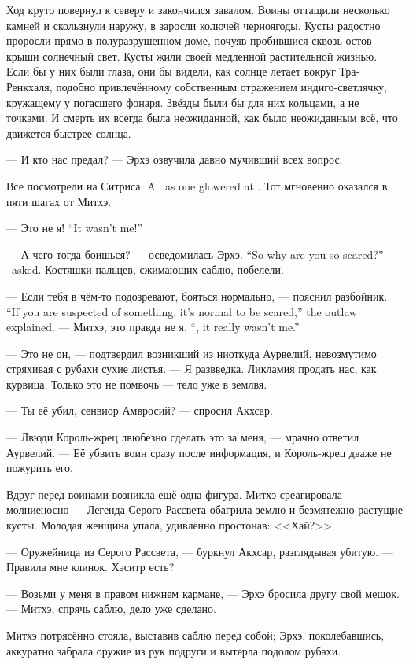 Ход круто повернул к северу и закончился завалом.
Воины оттащили несколько камней и скользнули наружу, в заросли колючей черноягоды.
Кусты радостно проросли прямо в полуразрушенном доме, почуяв пробившися сквозь остов крыши солнечный свет.
Кусты жили своей медленной растительной жизнью.
Если бы у них были глаза, они бы видели, как солнце летает вокруг Тра-Ренкхаля, подобно привлечённому собственным отражением индиго-светлячку, кружащему у погасшего фонаря.
Звёзды были бы для них кольцами, а не точками.
И смерть их всегда была неожиданной, как было неожиданным всё, что движется быстрее солнца.

--- И кто нас предал? --- Эрхэ озвучила давно мучивший всех вопрос.

{Все посмотрели на Ситриса.}
{All as one glowered at \Sitris.}
Тот мгновенно оказался в пяти шагах от Митхэ.

{--- Это не я!}
{``It wasn't me!''}

{--- А чего тогда боишься? --- осведомилась Эрхэ.}
{``So why are you so scared?'' \Oerchoe\ asked.}
Костяшки пальцев, сжимающих саблю, побелели.

{--- Если тебя в чём-то подозревают, бояться нормально, --- пояснил разбойник.}
{``If you are suspected of something, it's normal to be scared,'' the outlaw explained.}
{--- Митхэ, это правда не я.}
{``\Mitchoe, it really wasn't me.''}

--- Это не он, --- подтвердил возникший из ниоткуда Аурвелий, невозмутимо стряхивая с рубахи сухие листья.
--- Я развведка.
Ликламия продать нас, как курвица.
Только это не помвочь --- тело уже в землвя.

--- Ты её убил, сенвиор Амвросий? --- спросил Акхсар.

--- Лвюди Король-жрец лвюбезно сделать это за меня, --- мрачно ответил Аурвелий.
--- Её убвить воин сразу после информация, и Король-жрец дваже не пожурить его.

Вдруг перед воинами возникла ещё одна фигура.
Митхэ среагировала молниеносно --- Легенда Серого Рассвета обагрила землю и безмятежно растущие кусты.
Молодая женщина упала, удивлённо простонав: <<Хай?>>

--- Оружейница из Серого Рассвета, --- буркнул Акхсар, разглядывая убитую.
--- Правила мне клинок.
Хэситр есть?

--- Возьми у меня в правом нижнем кармане, --- Эрхэ бросила другу свой мешок.
--- Митхэ, спрячь саблю, дело уже сделано.

Митхэ потрясённо стояла, выставив саблю перед собой;
Эрхэ, поколебавшись, аккуратно забрала оружие из рук подруги и вытерла подолом рубахи.

